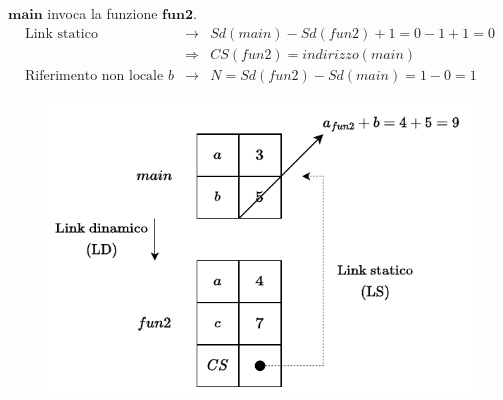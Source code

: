 \documentclass[a4paper]{article}
\begin{document}
	\noindent
	$\mathbf{main}$ invoca la funzione $\mathbf{fun2}$.
	\begin{equation*}
		\begin{array}{rcl}
			\text{Link statico} &\rightarrow& Sd(main) - Sd(fun2) + 1 = 0 - 1 + 1 = 0 \\ [.3em]
			&\Rightarrow& CS(fun2) = indirizzo(main) \\ [.3em]
			\text{Riferimento non locale }b &\rightarrow& N = Sd(fun2) - Sd(main) = 1 - 0 = 1
		\end{array}
	\end{equation*}
	\begin{figure}[!htp]
		\centering
		\includegraphics[width=\textwidth]{img/ex3-015.pdf}
	\end{figure}\newpage
	
\end{document}

